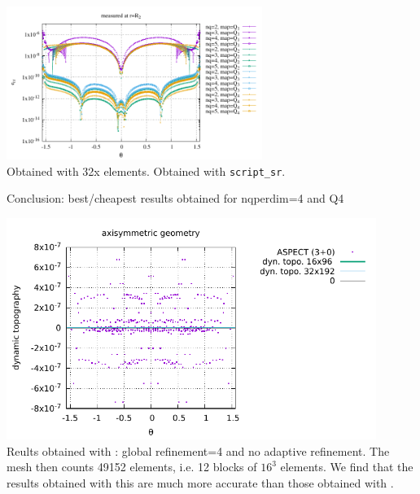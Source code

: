 \begin{center}
\includegraphics[width=8.3cm]{python_codes/fieldstone_152/results/exp1_axisymmetric/err_R2}\\
{\captionfont Obtained with 32x elements. Obtained with {\tt script\_sr}.}
\end{center}

Conclusion: best/cheapest results obtained for nqperdim=4 and Q4

\begin{center}
\includegraphics[width=12cm]{python_codes/fieldstone_152/results/exp1_axisymmetric/aspect/dynamic_topography.pdf}\\
{\captionfont Reults obtained with \aspect: global refinement=4 and no adaptive refinement. 
The mesh then counts 49152 elements, i.e. 12 blocks of $16^3$ elements. We find that the results
obtained with this \stone are much more accurate than those obtained with \aspect.}
\end{center}

